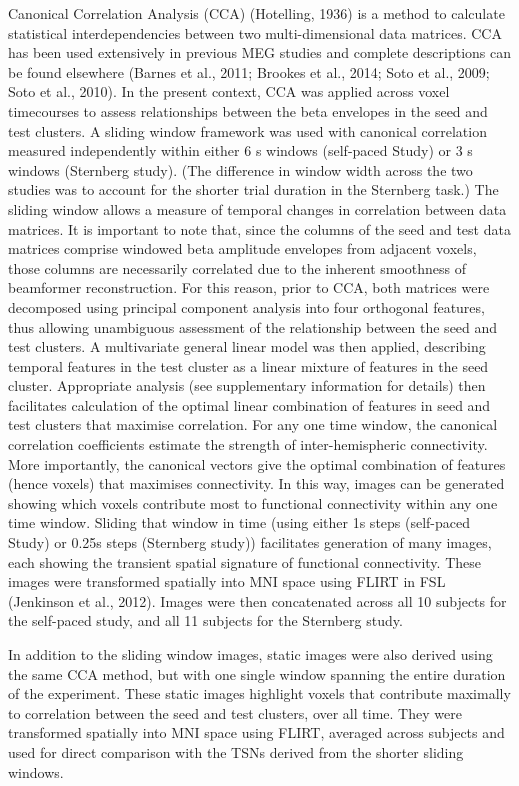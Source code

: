 Canonical Correlation Analysis (CCA) (Hotelling, 1936) is a method to calculate statistical interdependencies between two multi-dimensional data matrices. CCA has been used extensively in previous MEG studies and complete descriptions can be found elsewhere (Barnes et al., 2011; Brookes et al., 2014; Soto et al., 2009; Soto et al., 2010). In the present context, CCA was applied across voxel timecourses to assess relationships between the beta envelopes in the seed and test clusters. A sliding window framework was used with canonical correlation measured independently within either 6 s windows (self-paced Study) or 3 s windows (Sternberg study). (The difference in window width across the two studies was to account for the shorter trial duration in the Sternberg task.) The sliding window allows a measure of temporal changes in correlation between data matrices. It is important to note that, since the columns of the seed and test data matrices comprise windowed beta amplitude envelopes from adjacent voxels, those columns are necessarily correlated due to the inherent smoothness of beamformer reconstruction. For this reason, prior to CCA, both matrices were decomposed using principal component analysis into four orthogonal features, thus allowing unambiguous assessment of the relationship between the seed and test clusters. A multivariate general linear model was then applied, describing temporal features in the test cluster as a linear mixture of features in the seed cluster. Appropriate analysis (see supplementary information for details) then facilitates calculation of the optimal linear combination of features in seed and test clusters that maximise correlation. For any one time window, the canonical correlation coefficients estimate the strength of inter-hemispheric connectivity. More importantly, the canonical vectors give the optimal combination of features (hence voxels) that maximises connectivity. In this way, images can be generated showing which voxels contribute most to functional connectivity within any one time window. Sliding that window in time (using either 1s steps (self-paced Study) or 0.25s steps (Sternberg study)) facilitates generation of many images, each showing the transient spatial signature of functional connectivity. These images were transformed spatially into MNI space using FLIRT in FSL (Jenkinson et al., 2012). Images were then concatenated across all 10 subjects for the self-paced study, and all 11 subjects for the Sternberg study.

In addition to the sliding window images, static images were also derived using the same CCA method, but with one single window spanning the entire duration of the experiment. These static images highlight voxels that contribute maximally to correlation between the seed and test clusters, over all time. They were transformed spatially into MNI space using FLIRT, averaged across subjects and used for direct comparison with the TSNs derived from the shorter sliding windows.

